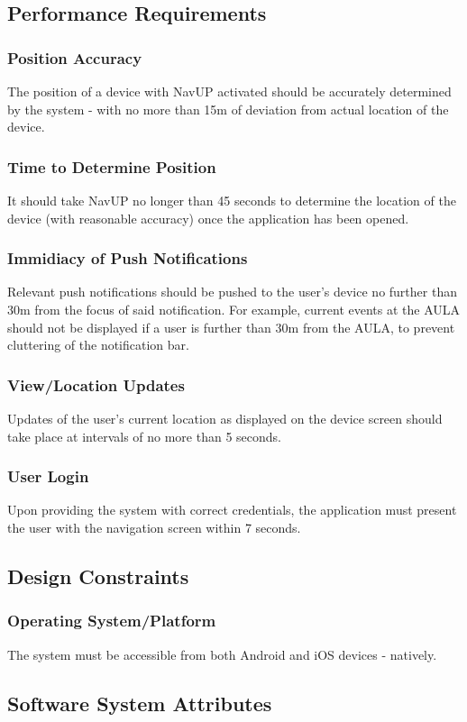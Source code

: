 \documentclass{article}
\begin{document}
	\subsection{Performance Requirements}
		\subsubsection{Position Accuracy} The position of a device with NavUP activated should be accurately determined by the system - with no more than 15m of deviation from actual location of the device.
		\subsubsection{Time to Determine Position} It should take NavUP no longer than 45 seconds to determine the location of the device (with reasonable accuracy) once the application has been opened.
		\subsubsection{Immidiacy of Push Notifications} Relevant push notifications should be pushed to the user's device no further than 30m from the focus of said notification. For example, current events at the AULA should not be displayed if a user is further than 30m from the AULA, to prevent cluttering of the notification bar.
		\subsubsection{View/Location Updates} Updates of the user's current location as displayed on the device screen should take place at intervals of no more than 5 seconds.
		\subsubsection{User Login} Upon providing the system with correct credentials, the application must present the user with the navigation screen within 7 seconds. 
	\subsection{Design Constraints}
		\subsubsection{Operating System/Platform} The system must be accessible from both Android and iOS devices - natively.		
	\subsection{Software System Attributes}
\end{document}
